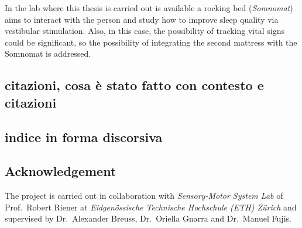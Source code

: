 \documentclass[a4paper,11pt, oneside,italian]{article}
\begin{document}
In the lab where this thesis is carried out is available a rocking bed (\textit{Somnomat}) aims to interact with the person and study how to improve sleep quality via vestibular stimulation. Also, in this case, the possibility of tracking vital signs could be significant, so the possibility of integrating the second mattress with the Somnomat is addressed.

\subsection*{citazioni, cosa è stato fatto con contesto e citazioni}





\subsection*{indice in forma discorsiva}

\subsection*{Acknowledgement}
The project is carried out in collaboration with \textit{Sensory-Motor System Lab} of Prof.~Robert Riener at \textit{Eidgenössische Technische Hochschule 
(ETH) Zürich} and supervised by Dr.~Alexander Breuss, Dr.~Oriella Gnarra and Dr.~Manuel Fujis.




\end{document}
